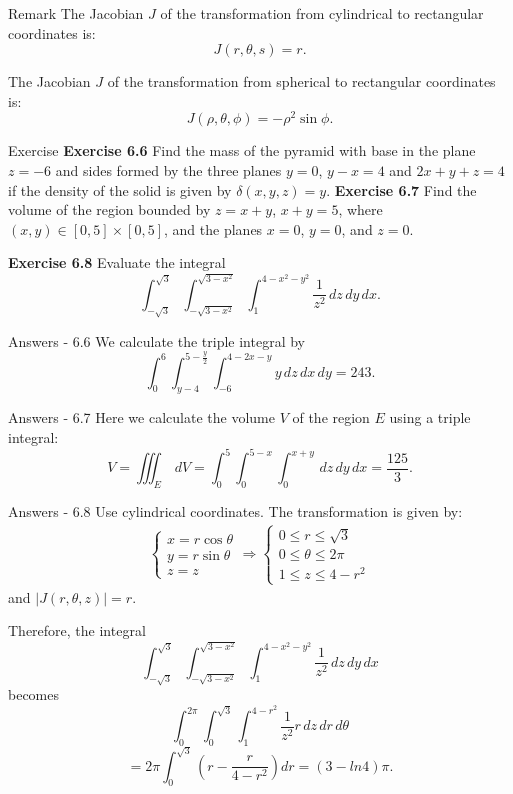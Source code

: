 \documentclass[aspectratio=169, UTF8]{ctexbeamer}
\begin{document}
\begin{frame}{Remark}
    The Jacobian \( J \) of the transformation from cylindrical to rectangular coordinates is:
\[ J(r, \theta, s) = r. \]

The Jacobian \( J \) of the transformation from spherical to rectangular coordinates is:
\[ J(\rho, \theta, \phi) = -\rho^2 \sin \phi. \]
\end{frame}
\begin{frame}{Exercise}
    \textbf{Exercise 6.6} Find the mass of the pyramid with base in the plane $z = -6$ and sides
formed by the three planes $y = 0$, $y - x = 4$ and $2x + y + z = 4$
if the density of the solid is given by $\delta(x, y, z) = y$.
    \textbf{Exercise 6.7} Find the volume of the region bounded by $z = x + y$, $x + y = 5$,
where $(x, y) \in [0, 5] \times [0, 5]$, and the planes $x = 0$, $y = 0$, and $z = 0$.

    \textbf{Exercise 6.8} Evaluate the integral
\[
\int_{-\sqrt{3}}^{\sqrt{3}} \int_{-\sqrt{3-x^2}}^{\sqrt{3-x^2}} \int_{1}^{4-x^2-y^2} \frac{1}{z^2} \, dz \, dy \, dx.
\]
\end{frame}
\begin{frame}{Answers - 6.6}
    We calculate the triple integral by
\[
\int_{0}^{6} \int_{y-4}^{5-\frac{y}{2}} \int_{-6}^{4-2x-y} y \, dz \, dx \, dy = 243.
\]
\end{frame}
\begin{frame}{Answers - 6.7}
    Here we calculate the volume $V$ of the region $E$ using a triple integral:
\[
V = \iiint_E \, dV = \int_0^5 \int_0^{5-x} \int_0^{x+y} \, dz \, dy \, dx = \frac{125}{3}.
\]

\end{frame}
\begin{frame}{Answers - 6.8}
    Use cylindrical coordinates. The transformation is given by:
\begin{align*}
\begin{cases}
x = r \cos \theta \\
y = r \sin \theta \\
z = z
\end{cases}
\Rightarrow
\begin{cases}
0 \leq r \leq \sqrt{3} \\
0 \leq \theta \leq 2\pi \\
1 \leq z \leq 4 - r^2
\end{cases}
\end{align*}
and $|J(r, \theta, z)| = r$.

Therefore, the integral
\[
\int_{-\sqrt{3}}^{\sqrt{3}} \int_{-\sqrt{3-x^2}}^{\sqrt{3-x^2}} \int_{1}^{4-x^2-y^2} \frac{1}{z^2} \, dz \, dy \, dx
\]
becomes
\[
\int_{0}^{2\pi} \int_{0}^{\sqrt{3}} \int_{1}^{4-r^2} \frac{1}{z^2} r \, dz \, dr \, d\theta 
\]
\[ 
= 2\pi \int_{0}^{\sqrt{3}} \left( r - \frac{r}{4 - r^2} \right) dr =(3-ln 4) \pi.
\]
\end{frame}
\end{document}
